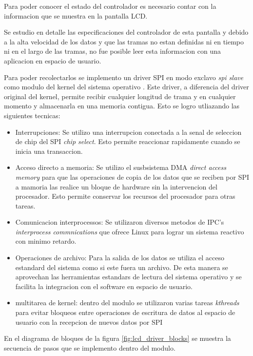       Para poder conocer el estado del controlador es necesario contar con la informacion que se muestra en la pantalla LCD.\par
      Se estudio en detalle las especificaciones del controlador de esta pantalla y debido a la alta velocidad de los datos y que las tramas no estan definidas ni en tiempo ni en el largo de las tramas, no fue posible leer esta informacion con una aplicacion en espacio de usuario. \par
      Para poder recolectarlos se implemento un driver SPI en modo exclavo \textit{spi slave} como modulo del kernel del sistema operativo \citep{book:ldd3}.
      Este driver, a diferencia del driver original del kernel, permite recibir cualquier longitud de trama y en cualquier momento y almacenarla en una memoria contigua.
      Esto se logro utliazando las siguientes tecnicas:
      \begin{itemize}
         \item {Interrupciones: Se utilizo una interrupcion conectada a la senal de seleccion de chip del SPI \textit{chip select}. Esto permite reaccionar rapidamente cuando se inicia una transaccion.}
         \item {Acceso directo a memoria: Se utilizo el susbsistema DMA \textit{direct access memory} para que las operaciones de copia de los datos que se reciben por SPI a mamoria las realice un bloque de hardware sin la intervencion del procesador. Esto permite conservar los recursos del procesador para otras tareas.}
         \item{Comunicacion interprocessos: Se utilizaron diversos metodos de IPC's \textit{interprocess commnications} que ofrece Linux para lograr un sistema reactivo con minimo retardo.}
         \item{Operaciones de archivo: Para la salida de los datos se utiliza el acceso estandard del sistema como si este fuera un archivo. De esta manera se aprovechan las herramientas estandars de lectura del sistema operativo y se facilita la integracion con el software en espacio de usuario.}
         \item{multitarea de kernel: dentro del modulo se utilizaron varias tareas \textit{kthreads} para evitar bloqueos entre operaciones de escritura de datos al espacio de usuario con la recepcion de nuevos datos por SPI}
      \end{itemize}

      En el diagrama de bloques de la figura \ref{fig:lcd_driver_blocks} se muestra la secuencia de pasos que se implemento dentro del modulo. 
      
